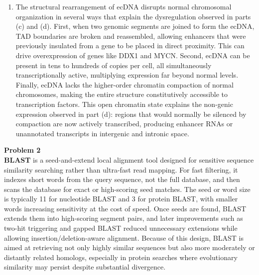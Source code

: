 \documentclass{article}
\begin{document}
\begin{enumerate}[label=\alph*)]
\begin{center}
          12716909-12723397, signal=616.500\\
          15586250-15634346, signal=605.738\\
          15908663-15947022, signal=286.098\\
          11773745-11827409, signal=131.441\\
          11771679-11773619, signal=85.078\\

    \end{center}
    These regions had significantly higher expression than two of the genes: NTSR2 and GREB1. Non-coding regions were defined using track ALL\_GENECODE49 and table wgEncodeGencodeCompV49, with a region defined by the provided ecDNA\_segments.bed file.

    \item 
    The structural rearrangement of ecDNA disrupts normal chromosomal organization in several ways that explain the dysregulation observed in parts (c) and (d). First, when two genomic segments are joined to form the ecDNA, TAD boundaries are broken and reassembled, allowing enhancers that were previously insulated from a gene to be placed in direct proximity. This can drive overexpression of genes like DDX1 and MYCN. Second, ecDNA can be present in tens to hundreds of copies per cell, all simultaneously transcriptionally active, multiplying expression far beyond normal levels. Finally, ecDNA lacks the higher-order chromatin compaction of normal chromosomes, making the entire structure constitutively accessible to transcription factors. This open chromatin state explains the non-genic expression observed in part (d): regions that would normally be silenced by compaction are now actively transcribed, producing enhancer RNAs or unannotated transcripts in intergenic and intronic space.
\end{enumerate}
\pagebreak
\textbf{Problem 2}\\
\textbf{BLAST} is a seed-and-extend local alignment tool designed for sensitive sequence similarity searching rather than ultra-fast read mapping. For fast filtering, it indexes short words from the query sequence, not the full database, and then scans the database for exact or high-scoring seed matches. The seed or word size is typically 11 for nucleotide BLAST and 3 for protein BLAST, with smaller words increasing sensitivity at the cost of speed. Once seeds are found, BLAST extends them into high-scoring segment pairs, and later improvements such as two-hit triggering and gapped BLAST reduced unnecessary extensions while allowing insertion/deletion-aware alignment. Because of this design, BLAST is aimed at retrieving not only highly similar sequences but also more moderately or distantly related homologs, especially in protein searches where evolutionary similarity may persist despite substantial divergence.\\
\end{document}
